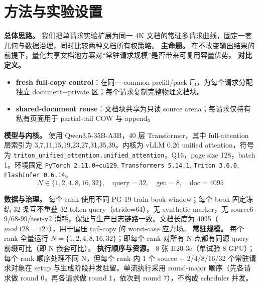 \documentclass[11pt]{article}
\begin{document}
\section{方法与实验设置}
\textbf{总体思路。} 我们把单请求实验扩展为同一 4K 文档的常驻多请求曲线，固定一套几何与数据治理，同时比较两种文档所有权策略。  
\textbf{主命题。} 在不改变输出结果的前提下，量化共享文档池方案对“常驻请求规模”是否带来可复用容量优势。
\textbf{对比定义。}
\begin{itemize}
  \item \textbf{fresh full-copy control}：在同一 common prefill/pack 后，为每个请求分配独立 document+private 区；每个请求复制完整物理文档块。  
  \item \textbf{shared-document reuse}：文档块共享为只读 source arena；每请求仅持有私有页面用于 partial-tail COW 与 append。  
\end{itemize}

\textbf{模型与内核。} 使用 Qwen3.5-35B-A3B，40 层 Transformer，其中 full-attention 层索引为 3,7,11,15,19,23,27,31,35,39。内核为 vLLM 0.26 unified attention，符号为 \verb|triton_unified_attention.unified_attention|，Q16，page size 128，batch 1。环境固定 \texttt{PyTorch 2.11.0+cu129}, \texttt{Transformers 5.14.1}, \texttt{Triton 3.6.0}, \texttt{FlashInfer 0.6.14}。
\[
N\in\{1,2,4,8,16,32\},\quad \text{query}=32,\quad \text{gen}=8,\quad \text{doc}=4095
\]

\textbf{数据与治理。} 每个 rank 使用不同 PG-19 train book window；每个 book 固定冻结 32 条互不重叠 32-token query（stride=64），无 synthetic marker，无 source6-9/68-99/test-v2 消耗，保证与生产日志链路一致。文档长度为 4095（$mod\,128=127$），用于偏压 tail-copy 的 worst-case 应力场。  
\textbf{常驻规模。} 每个 rank 全量运行 $N=\{1,2,4,8,16,32\}$；即每个 rank 对所有 N 点都有同源 query 前缀可比（即 N 嵌套可比）。  
\textbf{执行顺序与资源。} 8 张 H20-3e（单试验 8 GPU）；每个 rank 顺序处理不同 N，但每个 rank 内 1 个 source + 2/4/8/16/32 个常驻请求对象在 setup 与生成阶段并发驻留。单流执行采用 round-major 顺序（先各请求做 round 0，再各请求做 round 1，依次到 round 7），不构成 scheduler 并发。
\end{document}
